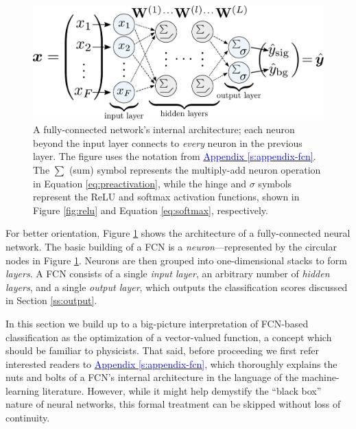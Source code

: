 \documentclass[11pt, a4paper]{article}
\newcommand{\myhref}[2]{\hyperref[#1]{\textcolor{blue}{#2}}}
\begin{document}
\begin{figure}[htb!]
    \centering
    \includegraphics[width=0.95\linewidth]{vector/fcn-architecture.pdf}
    \caption{A fully-connected network's internal architecture; each neuron beyond the input layer connects to \textit{every} neuron in the previous layer. The figure uses the notation from \myhref{s:appendix-fcn}{Appendix \ref{s:appendix-fcn}}. The $ \sum $ (sum) symbol represents the multiply-add neuron operation in Equation \ref{eq:preactivation}, while the hinge and $ \sigma $ symbols represent the ReLU and softmax activation functions, shown in Figure \ref{fig:relu} and Equation \ref{eq:softmax}, respectively.}
    \label{fig:fcn-architecture}
\end{figure}

For better orientation, Figure \ref{fig:fcn-architecture} shows the architecture of a fully-connected neural network. The basic building of a FCN is a \textit{neuron}---represented by the circular nodes in Figure \ref{fig:fcn-architecture}. Neurons are then grouped into one-dimensional stacks to form \textit{layers}. A FCN consists of a single \textit{input layer}, an arbitrary number of \textit{hidden layers}, and a single \textit{output layer}, which outputs the classification scores discussed in Section \ref{ss:output}. 

In this section we build up to a big-picture interpretation of FCN-based classification as the optimization of a vector-valued function, a concept which should be familiar to physicists. That said, before proceeding we first refer interested readers to \myhref{s:appendix-fcn}{Appendix \ref{s:appendix-fcn}}, which thoroughly explains the nuts and bolts of a FCN's internal architecture in the language of the machine-learning literature. However, while it might help demystify the ``black box'' nature of neural networks, this formal treatment can be skipped without loss of continuity.
\end{document}
